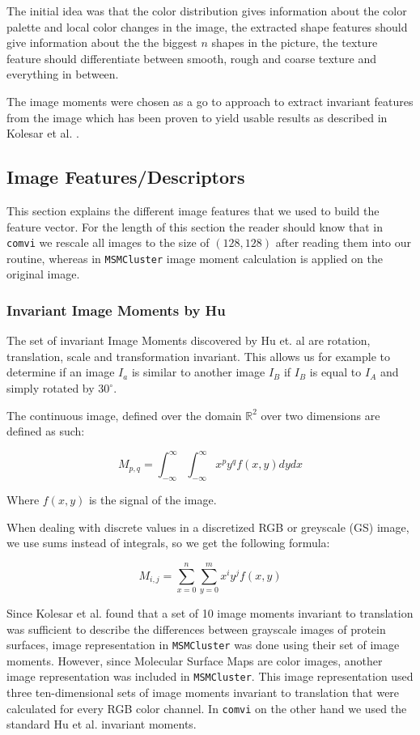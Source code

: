 \documentclass[journal]{vgtc}       %
\begin{document}
The initial idea was that the color distribution gives information about the color palette and local color changes in the image, the extracted shape features should give information about the the biggest \( n \) shapes in the picture, the texture feature should differentiate between smooth, rough and coarse texture and everything in between.

The image moments were chosen as a go to approach to extract invariant features from the image which has been proven to yield usable results as described in Kolesar et al. \cite{kolesar}.

\subsection{Image Features/Descriptors}
This section explains the different image features that we used to build the feature vector.
For the length of this section the reader should know that in \verb|comvi| we rescale  all images to the size of $(128,128)$ after reading them into our routine, whereas in \verb|MSMCluster| image moment calculation is applied on the original image.
\subsubsection{Invariant Image Moments by Hu}\label{subsec:humom}

The set of invariant Image Moments discovered by Hu et. al  are rotation, translation, scale and transformation  invariant. This allows us for example to determine if an image $I_a$ is similar to another image $I_B$ if $I_B$ is equal to $I_A$ and simply rotated by $30^{\circ}$.

The continuous  image, defined over the domain \(\mathbb{R}^2\)  over two dimensions are defined as such:

\[M_{p,q} = \int^\infty_{- \infty}\int^\infty_{- \infty} x^py^q f(x,y) dy dx \]

Where \(f(x, y)\) is the signal of the image.  

When dealing with discrete values  in a discretized RGB or greyscale (GS) image, we use sums instead of integrals, so we get the following formula:

\[M_{i,j} = \sum^n_{x=0}\sum^m_{y=0} x^i y^j f(x,y) \]


Since Kolesar et al. found that a set of 10 image moments invariant to translation was sufficient to describe the differences between grayscale images of protein surfaces, image representation in \verb|MSMCluster| was done using their set of image moments. However, since Molecular Surface Maps are color images, another image representation was included in \verb|MSMCluster|. This image representation used three ten-dimensional sets of image moments invariant to translation that were calculated for every RGB color channel. In \verb|comvi| on the other hand we used the standard  Hu et al. invariant moments. 
\end{document}
